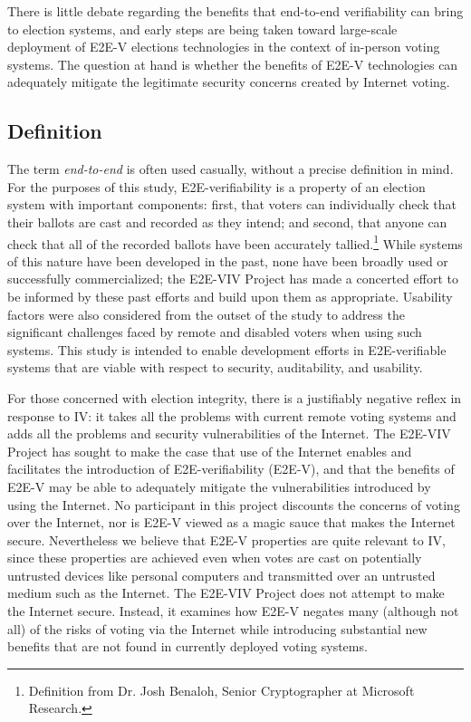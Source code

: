 There is little debate regarding the benefits that end-to-end
verifiability can bring to election systems, and early steps are being
taken toward large-scale deployment of E2E-V elections technologies in
the context of in-person voting systems. The question at hand is
whether the benefits of E2E-V technologies can adequately mitigate the
legitimate security concerns created by Internet voting.

\subsection{Definition}
\label{sec:definition}

The term \emph{end-to-end} is often used casually, without a precise
definition in mind. For the purposes of this study, E2E-verifiability
is a property of an election system with important components: first,
that voters can individually check that their ballots are cast and
recorded as they intend; and second, that anyone can check that all of
the recorded ballots have been accurately tallied.\footnote{Definition
  from Dr. Josh Benaloh, Senior Cryptographer at Microsoft Research.}
While systems of this nature have been developed in the past, none
have been broadly used or successfully commercialized; the E2E-VIV
Project has made a concerted effort to be informed by these past
efforts and build upon them as appropriate. Usability factors were
also considered from the outset of the study to address the
significant challenges faced by remote and disabled voters when using
such systems. This study is intended to enable development efforts in
E2E-verifiable systems that are viable with respect to security,
auditability, and usability.

For those concerned with election integrity, there is a justifiably
negative reflex in response to IV: it takes all the problems with
current remote voting systems and adds all the problems and security
vulnerabilities of the Internet. The E2E-VIV Project has sought to
make the case that use of the Internet enables and facilitates the
introduction of E2E-verifiability (E2E-V), and that the benefits of
E2E-V may be able to adequately mitigate the vulnerabilities
introduced by using the Internet. No participant in this project
discounts the concerns of voting over the Internet, nor is E2E-V
viewed as a magic sauce that makes the Internet secure. Nevertheless
we believe that E2E-V properties are quite relevant to IV, since these
properties are achieved even when votes are cast on potentially
untrusted devices like personal computers and transmitted over an
untrusted medium such as the Internet. The E2E-VIV Project does not
attempt to make the Internet secure. Instead, it examines how E2E-V
negates many (although not all) of the risks of voting via the
Internet while introducing substantial new benefits that are not found
in currently deployed voting systems.

